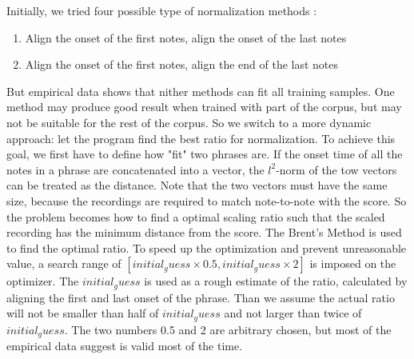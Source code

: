    Initially, we tried four possible type of normalization methods : 
   \begin{enumerate}
      \item Align the onset of the first notes, align the onset of the last notes
      \item Align the onset of the first notes, align the end of the last notes
   \end{enumerate}

   But empirical data shows that nither methods can fit all training samples. One method may produce good result when trained with part of the corpus, but may not be suitable for the rest of the corpus. So we switch to a more dynamic approach: let the program find the best ratio for normalization. To achieve this goal, we first have to define how "fit" two phrases are. If the onset time of all the notes in a phrase are concatenated into a vector, the $l^2$-norm of the tow vectors can be treated as the distance. Note that the two vectors must have the same size, because the recordings are required to match note-to-note with the score. So the problem becomes how to find a optimal scaling ratio such that the scaled recording has the minimum distance from the score. The Brent's Method\cite{brent1973} is used to find the optimal ratio. To speed up the optimization and prevent unreasonable value, a search range of $[initial_guess \times 0.5 , initial_guess \times 2]$ is imposed on the optimizer. The $initial_guess$ is used as a rough estimate of the ratio, calculated by aligning the first and last onset of the phrase. Than we assume the actual ratio will not be smaller than half of $initial_guess$ and not larger than twice of $initial_guess$. The two numbers 0.5 and 2 are arbitrary chosen, but most of the empirical data suggest is valid most of the time. 

